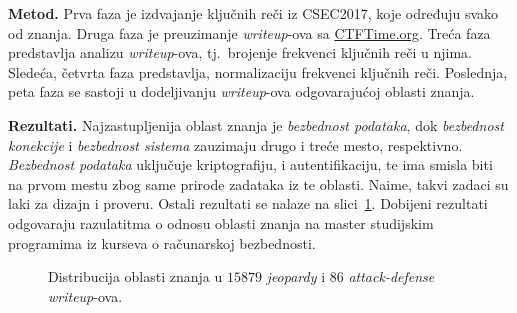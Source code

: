 \documentclass[12pt, a4paper, twocolumn]{article}
\begin{document}
\textbf{Metod.} Prva faza je izdvajanje ključnih reči iz CSEC2017, koje 
određuju svako od znanja. Druga faza je preuzimanje \emph{writeup}-ova sa 
\url{CTFTime.org}. Treća faza predstavlja analizu \emph{writeup}-ova, tj.\ 
brojenje frekvenci ključnih reči u njima. Sledeća, četvrta faza predstavlja, 
normalizaciju frekvenci ključnih reči. Poslednja, peta faza se sastoji u 
dodeljivanju \emph{writeup}-ova odgovarajućoj oblasti znanja.\cite{ctf_skills}

\textbf{Rezultati.} Najzastupljenija oblast znanja je 
\emph{bezbednost podataka}, dok \emph{bezbednost konekcije} i 
\emph{bezbednost sistema} zauzimaju drugo i treće mesto, respektivno. 
\emph{Bezbednost podataka} uključuje kriptografiju, i autentifikaciju, te ima 
smisla biti na prvom mestu zbog same prirode zadataka iz te oblasti. Naime,
takvi zadaci su laki za dizajn i proveru. Ostali rezultati se nalaze na 
slici~\ref{fig:ctf_ka}.\cite{ctf_skills} Dobijeni rezultati odgovaraju 
razulatitma o odnosu oblasti znanja na master studijskim programima iz 
kurseva o računarskoj bezbednosti.\cite{oth_ka, ctf_skills}

\begin{figure}
    \begin{center}
    \end{center}
    \caption{
        Distribucija oblasti znanja u $15 879$ \emph{jeopardy} i 
        $86$ \emph{attack-defense} \emph{writeup}-ova.\cite{ctf_skills}
    }\label{fig:ctf_ka}
\end{figure}
\end{document}
